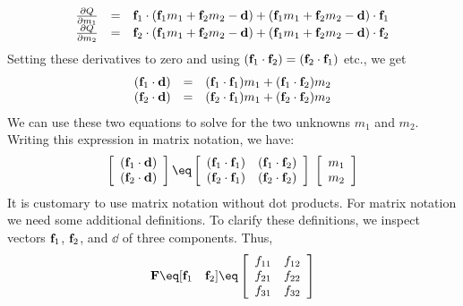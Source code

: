 \begin{equation} \label{eqn:Q1comp}
\begin{array}{rcl}
 {\partial Q \over \partial m_1} &= &
                    {\bf f}_1  \cdot ({\bf f}_1 m_1 + {\bf f}_2 m_2 -{\bf d} )  
                         +        ({\bf f}_1 m_1 + {\bf f}_2 m_2 -{\bf d} ) \cdot  {\bf f}_1
 \\
 {\partial Q \over \partial m_2} &= &
                            {\bf f}_2  \cdot ({\bf f}_1 m_1 + {\bf f}_2 m_2 -{\bf d} )  
                         +   ({\bf f}_1 m_1 + {\bf f}_2 m_2 -{\bf d} ) \cdot  {\bf f}_2
\end{array}
\end{equation}
Setting these derivatives to zero and using
$({\bf f}_1 \cdot {\bf f}_2)=({\bf f}_2 \cdot {\bf f}_1)$ etc.,
we get
\begin{equation}
\begin{array}{rcl}
({\bf f}_1 \cdot {\bf d} ) &= & ({\bf f}_1 \cdot {\bf f}_1) m_1 + ({\bf f}_1 \cdot {\bf f}_2)  m_2  \\
({\bf f}_2 \cdot {\bf d} ) &= & ({\bf f}_2 \cdot {\bf f}_1) m_1 + ({\bf f}_2 \cdot {\bf f}_2)
m_2
\end{array}
\end{equation}
We can use these two equations to solve for
the two unknowns $m_1$ and $m_2$.
Writing this expression in matrix notation, we have:
\begin{equation}
\left[ 
\begin{array}{c}
  (\ff_1 \cdot \dd ) \\ 
  (\ff_2 \cdot \dd ) \end{array} \right] 
\eq \left[ 
\begin{array}{ccc}
  (\ff_1 \cdot \ff_1) & (\ff_1 \cdot \ff_2)  \\
  (\ff_2 \cdot \ff_1) & (\ff_2 \cdot \ff_2)  \end{array} \right] 
\; \left[ 
\begin{array}{c}
  m_1 \\ 
  m_2 \end{array} \right]  \label{eqn:2by2}
\end{equation}
It is customary to use matrix notation without dot products.
For matrix notation
we need some additional definitions.
To clarify these definitions,
we inspect vectors 
${\bf f}_1$, ${\bf f}_2$, and $\dd$ of three components.
Thus,
\begin{equation}
\bold F \eq [ \ff_1 \quad \ff_2 ] \eq 
\left[ 
\begin{array}{ccc}
  f_{11} & f_{12}  \\
  f_{21} & f_{22}  \\
  f_{31} & f_{32}  \end{array} \right] 
\end{equation}
